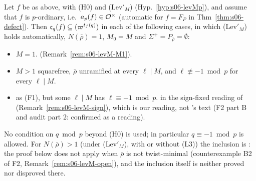 \begin{proposition}\label{prop:s06-levM}
Let $f$ be as above, with (H0) and (Lev$'_M$) (Hyp.~\ref{hyp:s06-levMp}), and assume that $f$ is $p$-ordinary, i.e.\ $a_p(f)\in\mathcal{O}^\times$
(automatic for $f=F_P$ in Thm~\ref{thm:s06-defect}). Then $\mathfrak{c}_q(f)\subseteq(\varpi^{t_f(q)})$ in each of the following cases, in which
(Lev$'_M$) holds automatically, $N(\bar\rho)=1$, $M_0=M$ and $\Sigma^+=P_{\bar\rho}=\emptyset$:
\begin{itemize}
\item[(F0)] $M=1$. \stpmc{} (Remark~\ref{rem:s06-levM-M1}).
\item[(F1)] $M>1$ squarefree, $\bar\rho$ unramified at every $\ell\mid M$, and $\ell\not\equiv-1\bmod p$ for every $\ell\mid M$.
  \stpmc
\item[(F1$'$)] as (F1), but some $\ell\mid M$ has $\ell\equiv-1\bmod p$. \stpmc{} in the sign-fixed reading of \cite[Thm~3.14]{KO}
  (Remark~\ref{rem:s06-levM-sign}), which is our reading, not \cite{KO}'s text (F2 part B and audit part 2: confirmed as a reading).

\end{itemize}
No condition on $q\bmod p$ beyond (H0) is used; in particular $q\equiv-1\bmod p$ is allowed. For $N(\bar\rho)>1$ (under (Lev$'_M$), with
or without (L3)) the inclusion is \stopen: the proof below does not apply when $\bar\rho$ is not twist-minimal (counterexample B2 of F2,
Remark~\ref{rem:s06-levM-open}), and the inclusion itself is neither proved nor disproved there.

\end{proposition}

